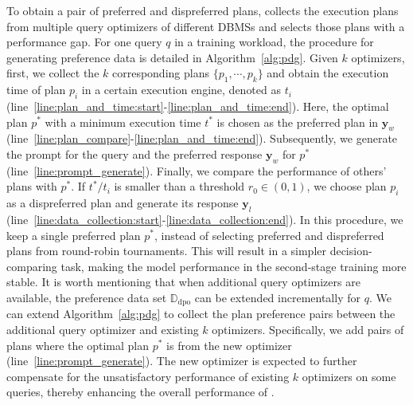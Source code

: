 To obtain a pair of preferred and dispreferred plans, \LLMQO collects the execution plans from multiple query optimizers of different DBMSs and selects those plans with a performance gap. 
For one query $q$ in a training workload, the procedure for generating preference data is detailed in Algorithm~\ref{alg:pdg}.
Given $k$ optimizers, first, we collect the $k$ corresponding plans $\{p_1, \cdots, p_k\}$ and obtain the execution time of plan $p_i$ in a certain execution engine, denoted as $t_i$ (line~\ref{line:plan_and_time:start}-\ref{line:plan_and_time:end}). Here, the optimal plan $p^*$ with a minimum execution time $t^*$ is chosen as the preferred plan in $\bm{y}_w$ (line~\ref{line:plan_compare}-\ref{line:plan_and_time:end}).   
Subsequently, we generate the prompt for the query and the preferred response $\bm{y}_w$ for $p^*$ (line~\ref{line:prompt_generate}).
Finally, we compare the performance of others' plans with $p^*$. If $t^*/t_{i}$ is smaller than a threshold $r_{0} \in (0, 1)$, we choose plan $p_i$ as a dispreferred plan and generate its response $\bm{y}_l$ (line~\ref{line:data_collection:start}-\ref{line:data_collection:end}). 
In this procedure, we keep a single preferred plan $p^*$, instead of selecting preferred and dispreferred plans from round-robin tournaments. 
This will result in a simpler decision-comparing task, making the model performance in the second-stage training more stable.
It is worth mentioning that when additional query optimizers are available, the preference data set $\mathbb{D}_{\mathrm{dpo}}$ can be extended incrementally for $q$. We can extend Algorithm~\ref{alg:pdg} to collect the plan preference pairs between the additional query optimizer and existing $k$ optimizers. Specifically, we add pairs of plans where the optimal plan $p^*$ is from the new optimizer (line~\ref{line:prompt_generate}). 
The new optimizer is expected to further compensate for the unsatisfactory performance of existing $k$ optimizers on some queries, thereby enhancing the overall performance of \LLMQO.




